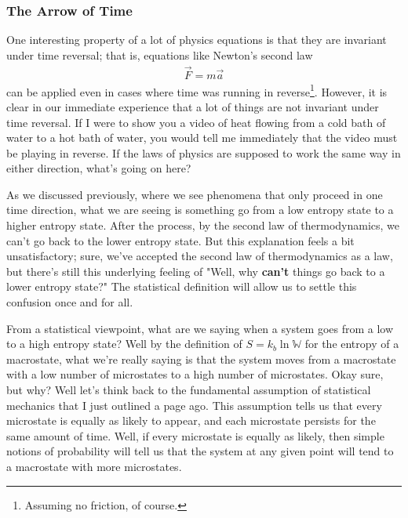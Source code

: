 \subsubsection{The Arrow of Time}
One interesting property of a lot of physics equations is that they are invariant under time reversal; that is, equations like Newton's second law 
\begin{align*}
\vec{F} = m\vec{a}
\end{align*}
can be applied even in cases where time was running in reverse\footnote{Assuming no friction, of course.}. However, it is clear in our immediate experience that a lot of things are not invariant under time reversal. If I were to show you a video of heat flowing from a cold bath of water to a hot bath of water, you would tell me immediately that the video must be playing in reverse. If the laws of physics are supposed to work the same way in either direction, what's going on here?

As we discussed previously, where we see phenomena that only proceed in one time direction, what we are seeing is something go from a low entropy state to a higher entropy state. After the process, by the second law of thermodynamics, we can't go back to the lower entropy state. But this explanation feels a bit unsatisfactory; sure, we've accepted the second law of thermodynamics as a law, but there's still this underlying feeling of "Well, why \textbf{can't} things go back to a lower entropy state?" The statistical definition will allow us to settle this confusion once and for all.

From a statistical viewpoint, what are we saying when a system goes from a low to a high entropy state? Well by the definition of $S = k_b\ln\mathbb{W}$ for the entropy of a macrostate, what we're really saying is that the system moves from a macrostate with a low number of microstates to a high number of microstates. Okay sure, but why? Well let's think back to the fundamental assumption of statistical mechanics that I just outlined a page ago. This assumption tells us that every microstate is equally as likely to appear, and each microstate persists for the same amount of time. Well, if every microstate is equally as likely, then simple notions of probability will tell us that the system at any given point will tend to a macrostate with more microstates.

